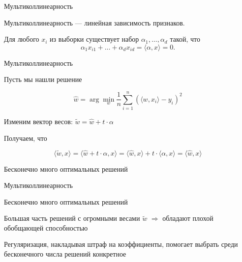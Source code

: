 \documentclass[notes,12pt, aspectratio=169]{beamer}
\newenvironment{wideitemize}{\itemize\addtolength{\itemsep}{10pt}}{\enditemize}
\begin{document}
\begin{frame}{Мультиколлинеарность}
	\begin{wideitemize}
		
		\item \alert{Мультиколлинеарность  —} линейная зависимость признаков.
		
		\item Для любого $x_i$ из выборки существует набор $\alpha_1, \ldots, \alpha_d$ такой, что \[\alpha_1 x_{i1} + \ldots + \alpha_d x_{id} = \langle \alpha, x \rangle =  0.\]
		
	\end{wideitemize}
\end{frame} 


\begin{frame}{Мультиколлинеарность}
	\begin{wideitemize}
		\item Пусть мы нашли решение 
		
		\[ \hat w = \arg \min_{w} \frac{1}{n} \sum_{i=1}^n ( \langle w, x_i \rangle - y_i )^2 \]
		
		\item  Изменим вектор весов: $\tilde w = \hat w + t \cdot \alpha$
		
		\item Получаем, что 
		
		\[ \langle \tilde w, x \rangle =  \langle \hat w + t \cdot \alpha, x \rangle = \langle \hat w, x \rangle + t \cdot \langle \alpha, x \rangle = \langle \hat w, x \rangle  \]
		
		\item Бесконечно много оптимальных решений
	\end{wideitemize}
\end{frame} 


\begin{frame}{Мультиколлинеарность}
	\begin{wideitemize}
		\item Бесконечно много оптимальных решений
		
		\item Большая часть решений с огромными весами $\tilde w$ $\Rightarrow$ обладают плохой обобщающей способностью 
		
		\item  Регуляризация, накладывая штраф на коэффициенты, помогает выбрать среди бесконечного числа решений конкретное
	\end{wideitemize}
\end{frame} 
\end{document}
